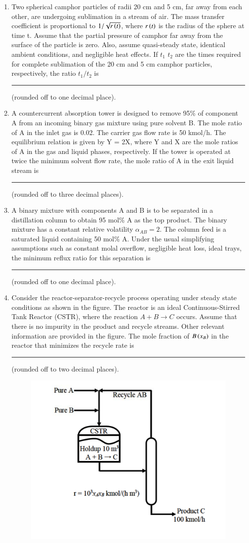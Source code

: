 \documentclass[journal,12pt,onecolumn]{IEEEtran}
\theoremstyle{remark}
\begin{document}
\begin{enumerate}
\begin{figure}[H]
    \end{figure}

    \item Two spherical camphor particles of radii 20 cm and 5 cm, far away from each other, are undergoing sublimation in a stream of air. The mass transfer coefficient is proportional to $1/\sqrt{r\left(t\right)}$, where $r\left(t\right)$ is the radius of the sphere at time t. Assume that the partial pressure of camphor far away from the surface of the particle is zero. Also, assume quasi-steady state, identical ambient conditions, and negligible heat effects. If $t_1$ $t_2$ are the times required for complete sublimation of the 20 cm and 5 cm camphor particles, respectively, the ratio $t_1/ t_2$ is \rule{2cm}{0.1mm}(rounded off to one decimal place). 

    \item A countercurrent absorption tower is designed to remove 95\% of component A from an incoming binary gas mixture using pure solvent B. The mole ratio of A in the inlet gas is 0.02. The carrier gas flow rate is 50 kmol/h. The equilibrium relation is given by Y = 2X, where Y and X are the mole ratios of A in the gas and liquid phases, respectively. If the tower is operated at twice the minimum solvent flow rate, the mole ratio of A in the exit liquid stream is \rule{2cm}{0.1mm} (rounded off to three decimal places). 

    \item A binary mixture with components A and B is to be separated in a distillation column to obtain 95 mol\% A as the top product. The binary mixture has a constant relative volatility $\alpha_{AB} = 2$. The column feed is a saturated liquid containing 50 mol\% A. Under the usual simplifying assumptions such as constant molal overflow, negligible heat loss, ideal trays, the minimum reflux ratio for this separation is \rule{2cm}{0.1mm}(rounded off to one decimal place). 
\newpage
    \item Consider the reactor-separator-recycle process operating under steady state conditions as shown in the figure. The reactor is an ideal Continuous-Stirred Tank Reactor (CSTR), where the reaction $A + B \to C$ occurs. Assume that there is no impurity in the product and recycle streams. Other relevant information are provided in the figure. The mole fraction of $B\left(x_{B}\right)$ in the reactor that minimizes the recycle rate is \rule{2cm}{0.1mm}(rounded off to two decimal places). 

\begin{figure}[H]
    \centering
    \includegraphics[width=0.5\columnwidth]{Fig/53.png}
    \caption*{}
    \label{fig:Q15}


\end{figure}
\end{enumerate}
\end{document}
